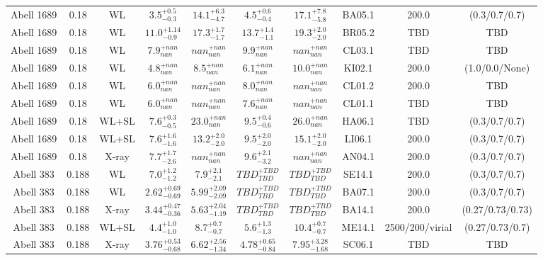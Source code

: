 \begin{table}
\begin{tabular}{cccccccccc}
Abell 1689 & 0.18 & WL & ${3.5}^{+0.5}_{-0.3}$ & ${14.1}^{+6.3}_{-4.7}$ & ${4.5}^{+0.6}_{-0.4}$ & ${17.1}^{+7.8}_{-5.8}$ & BA05.1 & 200.0 & (0.3/0.7/0.7) \\
Abell 1689 & 0.18 & WL & ${11.0}^{+1.14}_{-0.9}$ & ${17.3}^{+1.7}_{-1.7}$ & ${13.7}^{+1.4}_{-1.1}$ & ${19.3}^{+2.0}_{-2.0}$ & BR05.2 & TBD & TBD \\
Abell 1689 & 0.18 & WL & ${7.9}^{+nan}_{nan}$ & ${nan}^{+nan}_{nan}$ & ${9.9}^{+nan}_{nan}$ & ${nan}^{+nan}_{nan}$ & CL03.1 & TBD & TBD \\
Abell 1689 & 0.18 & WL & ${4.8}^{+nan}_{nan}$ & ${8.5}^{+nan}_{nan}$ & ${6.1}^{+nan}_{nan}$ & ${10.0}^{+nan}_{nan}$ & KI02.1 & 200.0 & (1.0/0.0/None) \\
Abell 1689 & 0.18 & WL & ${6.0}^{+nan}_{nan}$ & ${nan}^{+nan}_{nan}$ & ${8.0}^{+nan}_{nan}$ & ${nan}^{+nan}_{nan}$ & CL01.2 & 200.0 & TBD \\
Abell 1689 & 0.18 & WL & ${6.0}^{+nan}_{nan}$ & ${nan}^{+nan}_{nan}$ & ${7.6}^{+nan}_{nan}$ & ${nan}^{+nan}_{nan}$ & CL01.1 & TBD & TBD \\
Abell 1689 & 0.18 & WL+SL & ${7.6}^{+0.3}_{-0.5}$ & ${23.0}^{+nan}_{nan}$ & ${9.5}^{+0.4}_{-0.6}$ & ${26.0}^{+nan}_{nan}$ & HA06.1 & TBD & (0.3/0.7/0.7) \\
Abell 1689 & 0.18 & WL+SL & ${7.6}^{+1.6}_{-1.6}$ & ${13.2}^{+2.0}_{-2.0}$ & ${9.5}^{+2.0}_{-2.0}$ & ${15.1}^{+2.0}_{-2.0}$ & LI06.1 & 200.0 & (0.3/0.7/0.7) \\
Abell 1689 & 0.18 & X-ray & ${7.7}^{+1.7}_{-2.6}$ & ${nan}^{+nan}_{nan}$ & ${9.6}^{+2.1}_{-3.2}$ & ${nan}^{+nan}_{nan}$ & AN04.1 & 200.0 & (0.3/0.7/0.7) \\
Abell 383 & 0.188 & WL & ${7.0}^{+1.2}_{-1.2}$ & ${7.9}^{+2.1}_{-2.1}$ & ${TBD}^{+TBD}_{TBD}$ & ${TBD}^{+TBD}_{TBD}$ & SE14.1 & 200.0 & (0.3/0.7/0.7) \\
Abell 383 & 0.188 & WL & ${2.62}^{+0.69}_{-0.69}$ & ${5.99}^{+2.09}_{-2.09}$ & ${TBD}^{+TBD}_{TBD}$ & ${TBD}^{+TBD}_{TBD}$ & BA07.1 & 200.0 & (0.3/0.7/0.7) \\
Abell 383 & 0.188 & X-ray & ${3.44}^{+0.47}_{-0.36}$ & ${5.63}^{+2.04}_{-1.19}$ & ${TBD}^{+TBD}_{TBD}$ & ${TBD}^{+TBD}_{TBD}$ & BA14.1 & 200.0 & (0.27/0.73/0.73) \\
Abell 383 & 0.188 & WL+SL & ${4.4}^{+1.0}_{-1.0}$ & ${8.7}^{+0.7}_{-0.7}$ & ${5.6}^{+1.3}_{-1.3}$ & ${10.4}^{+0.7}_{-0.7}$ & ME14.1 & 2500/200/virial & (0.27/0.73/0.7) \\
Abell 383 & 0.188 & X-ray & ${3.76}^{+0.53}_{-0.68}$ & ${6.62}^{+2.56}_{-1.34}$ & ${4.78}^{+0.65}_{-0.84}$ & ${7.95}^{+3.28}_{-1.68}$ & SC06.1 & TBD & TBD \\

\end{tabular}
\end{table}
